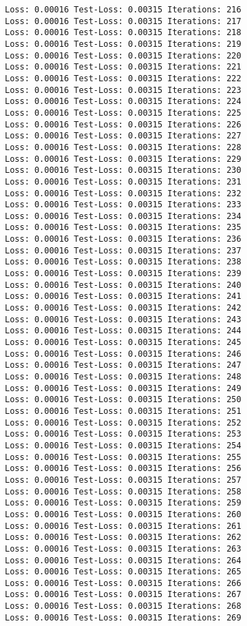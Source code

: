 \documentclass[11pt]{article}
\begin{document}
\begin{Verbatim}[commandchars=\\\{\}]
Loss: 0.00016 Test-Loss: 0.00315 Iterations: 216
Loss: 0.00016 Test-Loss: 0.00315 Iterations: 217
Loss: 0.00016 Test-Loss: 0.00315 Iterations: 218
Loss: 0.00016 Test-Loss: 0.00315 Iterations: 219
Loss: 0.00016 Test-Loss: 0.00315 Iterations: 220
Loss: 0.00016 Test-Loss: 0.00315 Iterations: 221
Loss: 0.00016 Test-Loss: 0.00315 Iterations: 222
Loss: 0.00016 Test-Loss: 0.00315 Iterations: 223
Loss: 0.00016 Test-Loss: 0.00315 Iterations: 224
Loss: 0.00016 Test-Loss: 0.00315 Iterations: 225
Loss: 0.00016 Test-Loss: 0.00315 Iterations: 226
Loss: 0.00016 Test-Loss: 0.00315 Iterations: 227
Loss: 0.00016 Test-Loss: 0.00315 Iterations: 228
Loss: 0.00016 Test-Loss: 0.00315 Iterations: 229
Loss: 0.00016 Test-Loss: 0.00315 Iterations: 230
Loss: 0.00016 Test-Loss: 0.00315 Iterations: 231
Loss: 0.00016 Test-Loss: 0.00315 Iterations: 232
Loss: 0.00016 Test-Loss: 0.00315 Iterations: 233
Loss: 0.00016 Test-Loss: 0.00315 Iterations: 234
Loss: 0.00016 Test-Loss: 0.00315 Iterations: 235
Loss: 0.00016 Test-Loss: 0.00315 Iterations: 236
Loss: 0.00016 Test-Loss: 0.00315 Iterations: 237
Loss: 0.00016 Test-Loss: 0.00315 Iterations: 238
Loss: 0.00016 Test-Loss: 0.00315 Iterations: 239
Loss: 0.00016 Test-Loss: 0.00315 Iterations: 240
Loss: 0.00016 Test-Loss: 0.00315 Iterations: 241
Loss: 0.00016 Test-Loss: 0.00315 Iterations: 242
Loss: 0.00016 Test-Loss: 0.00315 Iterations: 243
Loss: 0.00016 Test-Loss: 0.00315 Iterations: 244
Loss: 0.00016 Test-Loss: 0.00315 Iterations: 245
Loss: 0.00016 Test-Loss: 0.00315 Iterations: 246
Loss: 0.00016 Test-Loss: 0.00315 Iterations: 247
Loss: 0.00016 Test-Loss: 0.00315 Iterations: 248
Loss: 0.00016 Test-Loss: 0.00315 Iterations: 249
Loss: 0.00016 Test-Loss: 0.00315 Iterations: 250
Loss: 0.00016 Test-Loss: 0.00315 Iterations: 251
Loss: 0.00016 Test-Loss: 0.00315 Iterations: 252
Loss: 0.00016 Test-Loss: 0.00315 Iterations: 253
Loss: 0.00016 Test-Loss: 0.00315 Iterations: 254
Loss: 0.00016 Test-Loss: 0.00315 Iterations: 255
Loss: 0.00016 Test-Loss: 0.00315 Iterations: 256
Loss: 0.00016 Test-Loss: 0.00315 Iterations: 257
Loss: 0.00016 Test-Loss: 0.00315 Iterations: 258
Loss: 0.00016 Test-Loss: 0.00315 Iterations: 259
Loss: 0.00016 Test-Loss: 0.00315 Iterations: 260
Loss: 0.00016 Test-Loss: 0.00315 Iterations: 261
Loss: 0.00016 Test-Loss: 0.00315 Iterations: 262
Loss: 0.00016 Test-Loss: 0.00315 Iterations: 263
Loss: 0.00016 Test-Loss: 0.00315 Iterations: 264
Loss: 0.00016 Test-Loss: 0.00315 Iterations: 265
Loss: 0.00016 Test-Loss: 0.00315 Iterations: 266
Loss: 0.00016 Test-Loss: 0.00315 Iterations: 267
Loss: 0.00016 Test-Loss: 0.00315 Iterations: 268
Loss: 0.00016 Test-Loss: 0.00315 Iterations: 269

\end{Verbatim}
\end{document}
